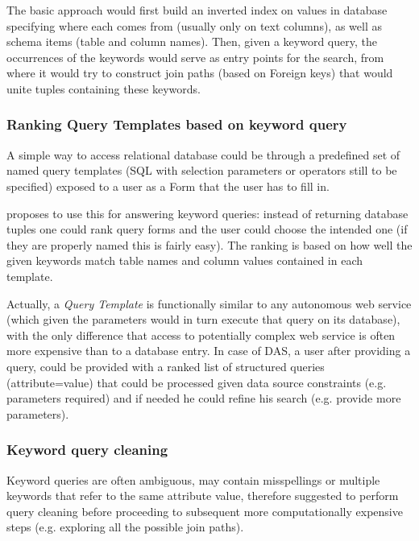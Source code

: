 The basic approach would first build an inverted index on values in database specifying where each comes from (usually only on text columns), as well as schema items (table and column names). 
%
Then, given a keyword query, the occurrences of the keywords would serve as entry points for the search, from where it would try to construct join paths (based on Foreign keys) that would unite tuples containing these keywords.
% 

\subsubsection*{Ranking Query Templates based on keyword query}
A simple way to access relational database could  be through a predefined set of named query templates (SQL with selection parameters or operators still to be specified) exposed to a user as a Form that the user has to fill in.

\cite{forms_kws} proposes to use this for answering keyword queries: instead of returning database tuples one could rank query forms and the user could choose the intended one (if they are properly named this is fairly easy). The ranking is based on how well the given keywords match table names and column values contained in each template.

Actually, a \textit{Query Template} is functionally similar to any autonomous web service (which given the parameters would in turn execute that query on its database), with the only difference that access to potentially complex web service is often more expensive than to a database entry.  In case of DAS, a user after providing a query, could be provided with a ranked list of structured queries (attribute=value) that could be processed given data source constraints (e.g. parameters required) and if needed he could refine his search (e.g. provide more parameters).

\subsubsection*{Keyword query cleaning}
Keyword queries are often ambiguous, may contain misspellings or multiple keywords that refer to the same attribute value,  therefore \cite{kw_cleaning} suggested to perform query cleaning before proceeding to subsequent more computationally expensive steps (e.g. exploring all the possible join paths).

